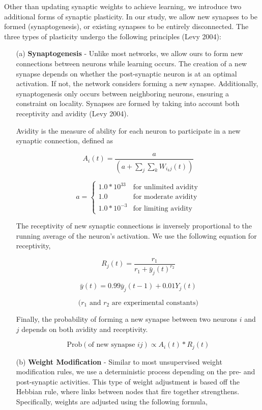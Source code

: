 \documentclass[journal]{./sty/IEEEtran}
\begin{document}
Other than updating synaptic weights to achieve learning, we introduce two additional forms of synaptic plasticity. 
In our study, we allow new synapses to be formed (synaptogenesis), or existing synapses to be entirely disconnected. 
The three types of plasticity undergo the following principles (Levy 2004):

\begin{itemize}
\item[(a)] {\bf Synaptogenesis} - 
Unlike most networks, we allow ours to form new connections between neurons while learning occurs. 
The creation of a new synapse depends on whether the post-synaptic neuron is at an optimal activation. 
If not, the network considers forming a new synapse.
Additionally, synaptogenesis only occurs between neighboring neurons, ensuring a constraint on locality.
Synapses are formed by taking into account both receptivity and avidity (Levy 2004).

\vspace{0.3cm}

Avidity is the measure of ability for each neuron to participate in a new synaptic connection, defined as

\[
A_i(t)=\frac{a}{(a + \sum_j\sum_kW_{i_kj}(t))}
\]

\[
a = \left\{
\begin{array}{lr}
  1.0 * 10^{33} & \text{for unlimited avidity}\\
  1.0 & \text{for moderate avidity}\\
  1.0 * 10^{-3} & \text{for limiting avidity}
\end{array}
\right.
\]

The receptivity of new synaptic connections is inversely proportional to the running average of the neuron's activation.
We use the following equation for receptivity,

\[
R_j(t) = \frac{r_1}{r_1 + \bar{y}_j(t)^{r_2}}
\]

\[
\bar{y}(t) = 0.99 \bar{y}_j(t-1) + 0.01 Y_j(t)
\]

\[
\text{(\(r_1\) and \(r_2\) are experimental constants)}
\]

Finally, the probability of forming a new synapse between two neurons \(i\) and \(j\) depends on both avidity and receptivity. 

\[
\text{Prob}(\text{of new synapse } ij ) \propto A_i(t) * R_j(t)
\]

\item[(b)] {\bf Weight Modification} - 
Similar to most unsupervised weight modification rules, we use a deterministic process depending on the pre- and post-synaptic activities.
This type of weight adjustment is based off the Hebbian rule, where links between nodes that fire together strengthens.
Specifically, weights are adjusted using the following formula,


\end{itemize}
\end{document}
